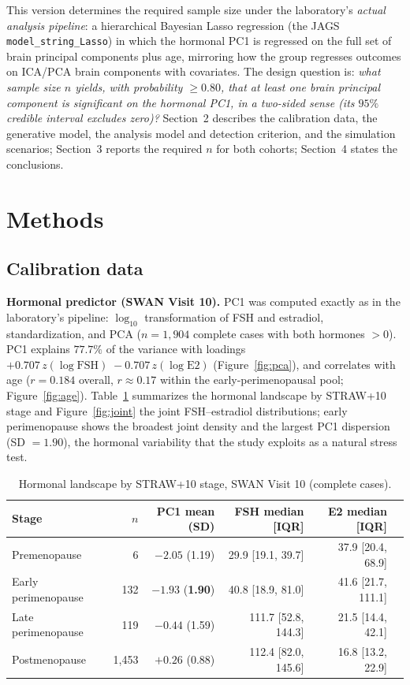 \documentclass[11pt,a4paper]{article}
\begin{document}
This version determines the required sample size under the laboratory's \emph{actual analysis pipeline}: a hierarchical Bayesian Lasso regression (the JAGS \texttt{model\_string\_Lasso}) in which the hormonal PC1 is regressed on the full set of brain principal components plus age, mirroring how the group regresses outcomes on ICA/PCA brain components with covariates. The design question is: \emph{what sample size $n$ yields, with probability $\ge0.80$, that at least one brain principal component is significant on the hormonal PC1, in a two-sided sense (its $95\%$ credible interval excludes zero)?} Section~2 describes the calibration data, the generative model, the analysis model and detection criterion, and the simulation scenarios; Section~3 reports the required $n$ for both cohorts; Section~4 states the conclusions.

\section{Methods}

\subsection{Calibration data}

\textbf{Hormonal predictor (SWAN Visit 10).} PC1 was computed exactly as in the laboratory's pipeline: $\log_{10}$ transformation of FSH and estradiol, standardization, and PCA ($n=1{,}904$ complete cases with both hormones $>0$). PC1 explains $77.7\%$ of the variance with loadings $+0.707\,z(\log \mathrm{FSH})\; -0.707\,z(\log \mathrm{E2})$ (Figure~\ref{fig:pca}), and correlates with age ($r=0.184$ overall, $r\approx0.17$ within the early-perimenopausal pool; Figure~\ref{fig:age}). Table~\ref{tab:stages} summarizes the hormonal landscape by STRAW+10 stage and Figure~\ref{fig:joint} the joint FSH--estradiol distributions; early perimenopause shows the broadest joint density and the largest PC1 dispersion (SD $=1.90$), the hormonal variability that the study exploits as a natural stress test.

\begin{table}[H]
\centering\small
\caption{Hormonal landscape by STRAW+10 stage, SWAN Visit 10 (complete cases).}
\label{tab:stages}
\begin{tabular}{lrrrrr}
\toprule
Stage & $n$ & PC1 mean (SD) & FSH median [IQR] & E2 median [IQR] \\
\midrule
Premenopause & 6 & $-2.05$ (1.19) & 29.9 [19.1, 39.7] & 37.9 [20.4, 68.9] \\
\rowcolor{RowGrey}
Early perimenopause & 132 & $-1.93$ (\textbf{1.90}) & 40.8 [18.9, 81.0] & 41.6 [21.7, 111.1] \\
Late perimenopause & 119 & $-0.44$ (1.59) & 111.7 [52.8, 144.3] & 21.5 [14.4, 42.1] \\
Postmenopause & 1{,}453 & $+0.26$ (0.88) & 112.4 [82.0, 145.6] & 16.8 [13.2, 22.9] \\
\bottomrule
\end{tabular}
\end{table}
\end{document}
